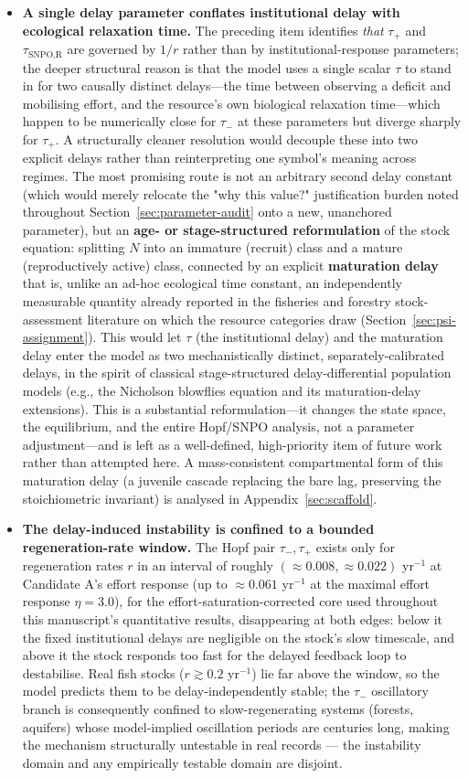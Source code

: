 \documentclass[twocolumn,10pt]{article}
\begin{document}
\begin{itemize}
\item \textbf{A single delay parameter conflates institutional delay with ecological relaxation time.} The preceding item identifies \emph{that} $\tau_+$ and $\tau_{\text{SNPO,R}}$ are governed by $1/r$ rather than by institutional-response parameters; the deeper structural reason is that the model uses a single scalar $\tau$ to stand in for two causally distinct delays---the time between observing a deficit and mobilising effort, and the resource's own biological relaxation time---which happen to be numerically close for $\tau_-$ at these parameters but diverge sharply for $\tau_+$. A structurally cleaner resolution would decouple these into two explicit delays rather than reinterpreting one symbol's meaning across regimes. The most promising route is not an arbitrary second delay constant (which would merely relocate the "why this value?" justification burden noted throughout Section~\ref{sec:parameter-audit} onto a new, unanchored parameter), but an \textbf{age- or stage-structured reformulation} of the stock equation: splitting $N$ into an immature (recruit) class and a mature (reproductively active) class, connected by an explicit \textbf{maturation delay} that is, unlike an ad-hoc ecological time constant, an independently measurable quantity already reported in the fisheries and forestry stock-assessment literature on which the resource categories draw (Section~\ref{sec:psi-assignment}). This would let $\tau$ (the institutional delay) and the maturation delay enter the model as two mechanistically distinct, separately-calibrated delays, in the spirit of classical stage-structured delay-differential population models (e.g., the Nicholson blowflies equation and its maturation-delay extensions). This is a substantial reformulation---it changes the state space, the equilibrium, and the entire Hopf/SNPO analysis, not a parameter adjustment---and is left as a well-defined, high-priority item of future work rather than attempted here. A mass-consistent compartmental form of this maturation delay (a juvenile cascade replacing the bare lag, preserving the stoichiometric invariant) is analysed in Appendix~\ref{sec:scaffold}.
\item \textbf{The delay-induced instability is confined to a bounded regeneration-rate window.} The Hopf pair $\tau_-,\tau_+$ exists only for regeneration rates $r$ in an interval of roughly $(\approx0.008,\approx0.022)$ yr$^{-1}$ at Candidate A's effort response (up to $\approx0.061$ yr$^{-1}$ at the maximal effort response $\eta=3.0$), for the effort-saturation-corrected core used throughout this manuscript's quantitative results, disappearing at both edges: below it the fixed institutional delays are negligible on the stock's slow timescale, and above it the stock responds too fast for the delayed feedback loop to destabilise. Real fish stocks ($r\gtrsim0.2$ yr$^{-1}$) lie far above the window, so the model predicts them to be delay-independently stable; the $\tau_-$ oscillatory branch is consequently confined to slow-regenerating systems (forests, aquifers) whose model-implied oscillation periods are centuries long, making the mechanism structurally untestable in real records --- the instability domain and any empirically testable domain are disjoint.

\end{itemize}
\end{document}
